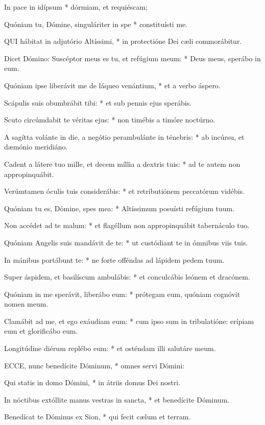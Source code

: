 In pace in idípsum * dórmiam, et requiéscam;

Quóniam tu, Dómine, singuláriter in spe * constituísti me.


\lettrine[lines=2]{Q}{UI} hábitat in adjutório Altíssimi, * in protectióne Dei cæli commorábitur.

Dicet Dómino: Suscéptor meus es tu, et refúgium meum: * Deus meus, sperábo in eum.

Quóniam ipse liberávit me de láqueo venántium, * et a verbo áspero.

Scápulis suis obumbrábit tibi: * et sub pennis ejus sperábis.

Scuto circúmdabit te véritas ejus: * non timébis a timóre noctúrno.

A sagítta volánte in die, a negótio perambulánte in ténebris: * ab incúrsu, et dæmónio meridiáno.

Cadent a látere tuo mille, et decem míllia a dextris tuis: * ad te autem non appropinquábit.

Verúmtamen óculis tuis considerábis: * et retributiónem peccatórum vidébis.

Quóniam tu es, Dómine, spes mea: * Altíssimum posuísti refúgium tuum.

Non accédet ad te malum: * et flagéllum non appropinquábit tabernáculo tuo.

Quóniam Angelis suis mandávit de te: * ut custódiant te in ómnibus viis tuis.

In mánibus portábunt te: * ne forte offéndas ad lápidem pedem tuum.

Super áspidem, et basilíscum ambulábis: * et conculcábis leónem et dracónem.

Quóniam in me sperávit, liberábo eum: * prótegam eum, quóniam cognóvit nomen meum.

Clamábit ad me, et ego exáudiam eum: * cum ipso sum in tribulatióne: erípiam eum et glorificábo eum.

Longitúdine diérum replébo eum: * et osténdam illi salutáre meum.


\lettrine[lines=2]{E}{CCE}, nunc benedícite Dóminum, * omnes servi Dómini:

Qui statis in domo Dómini, * in átriis domus Dei nostri.

In nóctibus extóllite manus vestras in sancta, * et benedícite Dóminum.

Benedícat te Dóminus ex Sion, * qui fecit cælum et terram.

